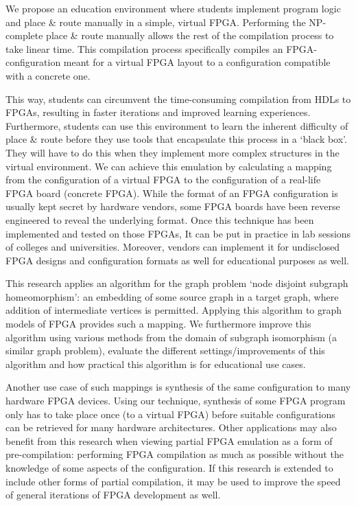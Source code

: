 We propose an education environment where students implement program logic and place \& route manually in a simple, virtual FPGA. Performing the NP-complete place \& route manually allows the rest of the compilation process to take linear time. This compilation process specifically compiles an FPGA-configuration meant for a virtual FPGA layout to a configuration compatible with a concrete one.

This way, students can circumvent the time-consuming compilation from HDLs to FPGAs, resulting in faster iterations and improved learning experiences. Furthermore, students can use this environment to learn the inherent difficulty of place \& route before they use tools that encapsulate this process in a `black box'. They will have to do this when they implement more complex structures in the virtual environment. We can achieve this emulation by calculating a mapping from the configuration of a virtual FPGA to the configuration of a real-life FPGA board (concrete FPGA). While the format of an FPGA configuration is	 usually kept secret by hardware vendors\cite{Hauck:2007:RCT:1564780, 8653869, 6339165}, some FPGA boards have been reverse engineered to reveal the underlying format\cite{Yu2018}. Once this technique has been implemented and tested on those FPGAs, It can be put in practice in lab sessions of colleges and universities. Moreover, vendors can implement it for undisclosed FPGA designs and configuration formats as well for educational purposes as well.

This research applies an algorithm for the graph problem `node disjoint subgraph homeomorphism': an embedding of some source graph in a target graph, where addition of intermediate vertices is permitted. Applying this algorithm to graph models of FPGA provides such a mapping. We furthermore improve this algorithm using various methods from the domain of subgraph isomorphism (a similar graph problem), evaluate the different settings/improvements of this algorithm and how practical this algorithm is for educational use cases. 

Another use case of such mappings is synthesis of the same configuration to many hardware FPGA devices. Using our technique, synthesis of some FPGA program only has to take place once (to a virtual FPGA) before suitable configurations can be retrieved for many hardware architectures. Other applications may also benefit from this research when viewing partial FPGA emulation as a form of pre-compilation: performing FPGA compilation as much as possible without the knowledge of some aspects of the configuration. If this research is extended to include other forms of partial compilation, it may be used to improve the speed of general iterations of FPGA development as well.
